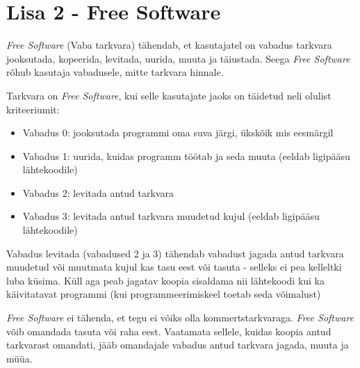 \documentclass[a4paper,12pt]{article} %
\begin{document}
\section*{Lisa 2 - Free Software}
\label{lisa_free_software}
\textit{Free Software} (Vaba tarkvara) tähendab, et kasutajatel on vabadus tarkvara jooksutada, kopeerida, levitada, uurida, muuta ja täiustada. Seega \textit{Free Software} rõhub kasutaja vabadusele, mitte tarkvara hinnale. \par
Tarkvara on \textit{Free Software}, kui selle kasutajate jaoks on täidetud neli olulist kriteeriumit:
\begin{itemize}
\item Vabadus 0: jooksutada programmi oma suva järgi, ükskõik mis eesmärgil
\item Vabadus 1: uurida, kuidas programm töötab ja seda muuta (eeldab ligipääsu lähtekoodile)
\item Vabadus 2: levitada antud tarkvara
\item Vabadus 3: levitada antud tarkvara muudetud kujul (eeldab ligipääsu lähtekoodile)
\end{itemize}
Vabadus levitada (vabadused 2 ja 3) tähendab vabadust jagada antud tarkvara muudetud või muutmata kujul kas tasu eest või tasuta - selleks ei pea kelleltki luba küsima. Küll aga peab jagatav koopia sisaldama nii lähtekoodi kui ka käivitatavat programmi (kui programmeerimiskeel toetab seda võimalust)\par
\textit{Free Software} ei tähenda, et tegu ei võiks olla kommertstarkvaraga. \textit{Free Software} võib omandada tasuta või raha eest. Vaatamata sellele, kuidas koopia antud tarkvarast omandati,  jääb omandajale vabadus antud tarkvara jagada, muuta ja müüa.
\cite{GNU_Free_SW}
\end{document}

